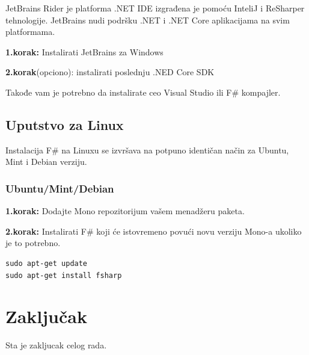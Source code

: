 \documentclass[a4paper]{article}
\begin{document}
JetBrains Rider je platforma .NET IDE izgrađena je pomoću InteliJ i  ReSharper tehnologije. JetBrains nudi podršku .NET i .NET Core aplikacijama na svim platformama.

\textbf{1.korak:} Instalirati JetBrains za Windows

\textbf{2.korak}(opciono): instalirati poslednju .NED Core SDK

Takođe vam je potrebno da instalirate ceo Visual Studio ili F\# kompajler.


\subsection{Uputstvo za Linux}

Instalacija F\# na Linuxu se izvršava na potpuno identičan način za Ubuntu, Mint i Debian verziju.

\subsubsection{Ubuntu/Mint/Debian}

\textbf{1.korak:} Dodajte Mono\cite{mono} repozitorijum vašem menadžeru paketa.

\textbf{2.korak:} Instalirati F\# koji će istovremeno povući novu verziju Mono-a ukoliko je to potrebno.
\\
\begin{lstlisting}
sudo apt-get update
sudo apt-get install fsharp
\end{lstlisting}
 

\section{Zaključak}
\label{sec:zakljucak}

Sta je zakljucak celog rada.

\appendix
 

\end{document}
